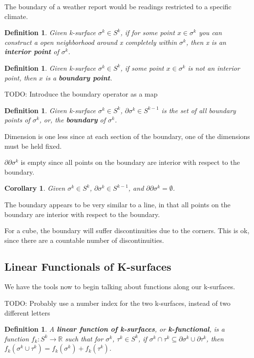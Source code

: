 \documentclass{book}
\newtheorem{defn}[equation]{Definition}
\newtheorem{coro}[equation]{Corollary}
\begin{document}
The boundary of a weather report would be readings restricted to a specific climate. 


\begin{defn}
	Given k-surface $\sigma^k \in S^k$, if for some point $x \in \sigma^k$ you can construct a open neighborhood around x completely within $\sigma^k$, then x is an \textbf{interior point} of $\sigma^k$. 
\end{defn}

\begin{defn}
	Given k-surface $\sigma^k \in S^k$, if some point $x \in \sigma^k$ is not an interior point, then $x$ is a \textbf{boundary point}.
\end{defn}


TODO: Introduce the boundary operator as a map
\begin{defn}
	Given k-surface $\sigma^k \in S^k$, $\partial \sigma^k \in S^{k-1}$ is the set of all boundary points of $\sigma^k$, or, the \textbf{boundary} of $\sigma^k$. 
\end{defn}

Dimension is one less since at each section of the boundary, one of the dimensions must be held fixed.

$\partial\partial \sigma^k$ is empty since all points on the boundary are interior with respect to the boundary.


\begin{coro}
	Given $\sigma^k \in S^k$, $\partial \sigma^k \in S^{k-1}$, and $\partial\partial \sigma^k = \emptyset$. 
\end{coro}


The boundary appears to be very similar to a line, in that all points on the boundary are interior with respect to the boundary. 

For a cube, the boundary will suffer discontinuities due to the corners. This is ok, since there are a countable number of discontinuities. 

\subsection{Linear Functionals of K-surfaces}

We have the tools now to begin talking about functions along our k-surfaces. 


TODO: Probably use a number index for the two k-surfaces, instead of two different letters 
\begin{defn}
	A \textbf{linear function of k-surfaces}, or \textbf{k-functional}, is a function $f_k : S^k \to \mathbb{R}$ such that for $\sigma^k$, $\tau^k \in S^k$, if $\sigma^k \cap \tau^k \subseteq \partial \sigma^k \cup \partial \tau^k$, then $f_k(\sigma^k\cup \tau^k) = f_k(\sigma^k) + f_k(\tau^k)$. 
\end{defn}
\end{document}
